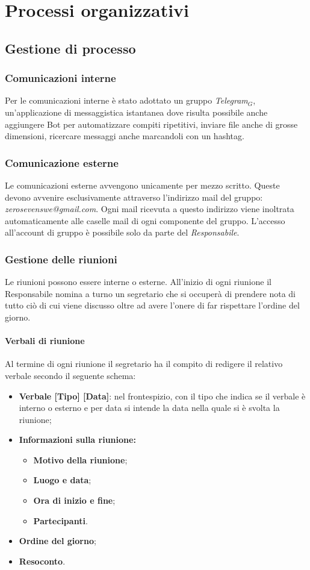 \chapter{Processi organizzativi}\label{Po}
\section{Gestione di processo}
\subsection{Comunicazioni interne}
Per le comunicazioni interne è stato adottato un gruppo \textit{Telegram$_{G}$}, un'applicazione di messaggistica istantanea dove risulta possibile anche aggiungere Bot per automatizzare compiti ripetitivi, inviare file anche di grosse dimensioni, ricercare messaggi anche marcandoli con un hashtag.
\subsection{Comunicazione esterne}
Le comunicazioni esterne avvengono unicamente per mezzo scritto. 
Queste devono avvenire esclusivamente attraverso l'indirizzo mail del gruppo: \textit{zerosevenswe@gmail.com}.
Ogni mail ricevuta a questo indirizzo viene inoltrata automaticamente alle caselle mail di ogni componente del gruppo. L'accesso all'account di gruppo è possibile solo da parte del \textit{Responsabile}.
\subsection{Gestione delle riunioni}
Le riunioni possono essere interne o esterne. 
All'inizio di ogni riunione il Responsabile nomina a turno un segretario che si occuperà di prendere nota di tutto ciò di cui viene discusso oltre ad avere l'onere di far rispettare l'ordine del giorno.
\subsubsection{Verbali di riunione}
Al termine di ogni riunione il segretario ha il compito di redigere il relativo verbale secondo il seguente schema:
\begin{itemize}
	\item \textbf{Verbale [Tipo] [Data]}: nel frontespizio, con il tipo che indica se il verbale è interno o esterno e per data si intende la data nella quale si è svolta la riunione;
	\item \textbf{Informazioni sulla riunione:}
	\begin{itemize}
			\item \textbf{Motivo della riunione};
			\item \textbf{Luogo e data};
			\item \textbf{Ora di inizio e fine};
			\item \textbf{Partecipanti}.
	\end{itemize}
	\item \textbf{Ordine del giorno};
	\item \textbf{Resoconto}.
\end{itemize}
